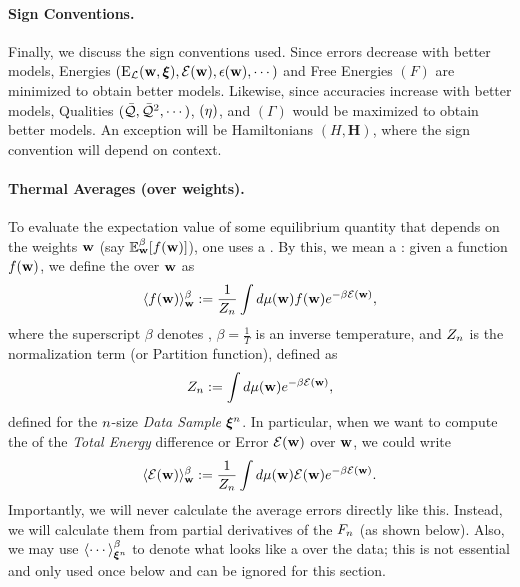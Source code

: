 \paragraph{Sign Conventions.}
Finally, we discuss the sign conventions used.  Since errors decrease with better models,
Energies $(\mathrm{E}_{\mathcal{L}}(\mathbf{w},\boldsymbol{\xi}), \mathcal{E}(\mathbf{w}), \epsilon({\mathbf{w}}), \cdots)$ and Free Energies $(F)$ are minimized to obtain better models.
Likewise, since accuracies increase with better models, Qualities $(\bar{\mathcal{Q}}, \bar{\mathcal{Q}}^{2}, \cdots)$,
\SelfOverlap $(\eta)$, and \Quality \GeneratingFunction $(\Gamma)$ would be maximized to obtain better models.
An exception will be Hamiltonians $(H,\mathbf{H})$, where the sign convention will depend on context.

\paragraph{Thermal Averages (over weights).}

To evaluate the expectation value of some equilibrium quantity that depends on the weights ${\mathbf{w}}$ (say $\mathbb{E}^{\beta}_{{\mathbf{w}}}[f({\mathbf{w}})]$), one uses a \ThermalAverage.
By this, we mean a \emph{\BoltzmannWeightedAverage}: given a function $f({\mathbf{w}})$,
we define the \ThermalAverage over ${\mathbf{w}}$ as
\begin{align}
\label{eqn:thrmavg}
\langle f({\mathbf{w}})\rangle_{{\mathbf{w}}}^{{\beta}}:=\dfrac{1}{Z_{n}}\int d\mu({\mathbf{w}}) f({\mathbf{w}})e^{-\beta \mathcal{E}(\mathbf{w})}  ,
\end{align}
where the superscript $\beta$ denotes \ThermalAverage,
$\beta=\frac{1}{T}$ is an inverse temperature, and 
$Z_{n}$ is the normalization term (or Partition function), defined as
\begin{align}
\label{eqn:Zwn}
Z_{n}:=\int d\mu({\mathbf{w}}) e^{-\beta \mathcal{E}(\mathbf{w})},
\end{align}
defined for the $n$-size \emph{Data Sample} $\boldsymbol{\xi}^{n}$.
%
In particular, when we want to compute the \ThermalAverage of the \emph{Total Energy} difference or Error
$\mathcal{E}(\mathbf{w})$ over ${\mathbf{w}}$, we could write
\begin{align}
\label{eqn:Detot}
\langle \mathcal{E}(\mathbf{w}) \rangle^{\beta}_{{\mathbf{w}}}:=\dfrac{1}{Z_{n}}\int d\mu({\mathbf{w}}) \mathcal{E}(\mathbf{w}) e^{-\beta \mathcal{E}(\mathbf{w})} .
\end{align}
Importantly, we will never calculate the average errors directly like this.
Instead, we will calculate them from partial derivatives of the \FreeEnergy $F_{n}$ (as shown below).
Also, we may use $\langle \cdots \rangle^{\beta}_{\boldsymbol{\xi}^{n}}$ to denote what looks like a \ThermalAverage over the data;
this is not essential and only used once below and can be ignored for this section.

